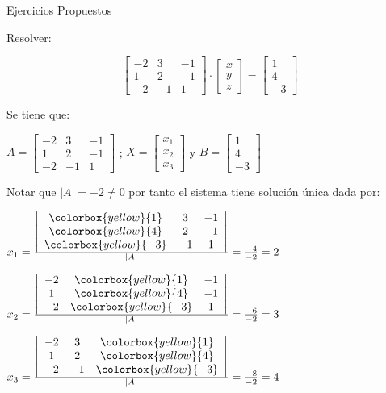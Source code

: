 {Ejercicios Propuestos}

Resolver:

$$\begin{bmatrix}
-2  &  3   & -1\\ 
1   & 2    & -1 \\
-2  &  -1  & 1 
\end{bmatrix}
 \cdot
\begin{bmatrix}
x\\ 
y \\
z
\end{bmatrix}
=
\begin{bmatrix}
1\\ 
4 \\
-3
\end{bmatrix}
$$





Se tiene que:

$A= \begin{bmatrix}
-2  &  3   & -1\\ 
1   & 2    & -1 \\
-2  &  -1  & 1 
\end{bmatrix}
$
;
$
X=
\begin{bmatrix}
x_1\\ 
x_2\\
x_3
\end{bmatrix}
$
y
$
B=
\begin{bmatrix}
1\\ 
4 \\
-3
\end{bmatrix}
$

Notar que $|A| = -2\neq 0$ por tanto el sistema tiene solución única dada por:

$x_1= \frac{\left|
\begin{array}{ccc}
\colorbox{yellow}{1} &  3   & -1\\ 
 \colorbox{yellow}{4}& 2    & -1 \\
 \colorbox{yellow}{-3}&  -1  & 1 
\end{array}
\right|}
{|A|}
=
\frac{-4}{-2}=2$


$x_2= \frac{\left|
\begin{array}{ccc}
-2&  \colorbox{yellow}{1}  & -1\\ 
 1 &  \colorbox{yellow}{4}   & -1 \\
-2 &  \colorbox{yellow}{-3}  & 1 
\end{array}
\right|}
{|A|}
=
\frac{-6}{-2}=3$


$x_3= \frac{\left|
\begin{array}{ccc}
 -2&  3   & \colorbox{yellow}{1}\\ 
1  & 2    &  \colorbox{yellow}{4} \\
-2 &  -1  &   \colorbox{yellow}{-3}
\end{array}
\right|}
{|A|}
=
\frac{-8}{-2}=4$


